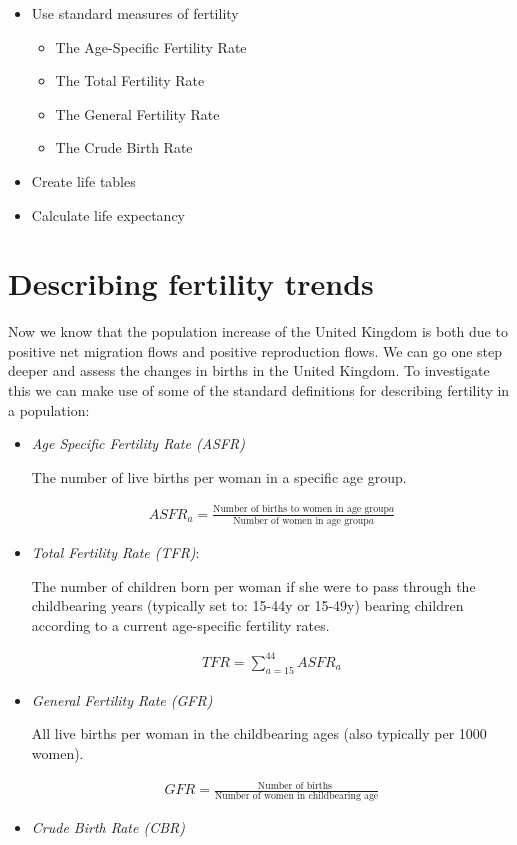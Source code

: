 \documentclass[]{book}
\providecommand{\tightlist}{%
  \setlength{\itemsep}{0pt}\setlength{\parskip}{0pt}}
\begin{document}
\begin{itemize}
\tightlist
\item
  Use standard measures of fertility

  \begin{itemize}
  \tightlist
  \item
    The Age-Specific Fertility Rate
  \item
    The Total Fertility Rate
  \item
    The General Fertility Rate
  \item
    The Crude Birth Rate
  \end{itemize}
\item
  Create life tables
\item
  Calculate life expectancy
\end{itemize}

\hypertarget{describing-fertility-trends}{%
\section{Describing fertility trends}\label{describing-fertility-trends}}

Now we know that the population increase of the United Kingdom is both due to positive net migration flows and positive reproduction flows. We can go one step deeper and assess the changes in births in the United Kingdom. To investigate this we can make use of some of the standard definitions for describing fertility in a population:

\begin{itemize}
\item
  \emph{Age Specific Fertility Rate (ASFR)}

  The number of live births per woman in a specific age group.

  \begin{align}
        ASFR_a=\frac{\text{Number of births to women in age group} a}{\text{Number of  women in age     group} a}
    \end{align}
\item
  \emph{Total Fertility Rate (TFR)}:

  The number of children born per woman if she were to pass through the childbearing years (typically set to: 15-44y or 15-49y) bearing children according to a current age-specific fertility rates.

  \begin{align}
    TFR=\sum_{a=15}^{44}ASFR_a
  \end{align}
\item
  \emph{General Fertility Rate (GFR)}

  All live births per woman in the childbearing ages (also typically per 1000 women).

  \begin{align}
    GFR=\frac{\text{Number of births }}{\text{Number of  women in childbearing age} }
  \end{align}
\item
  \emph{Crude Birth Rate (CBR)}
\end{itemize}
\end{document}
